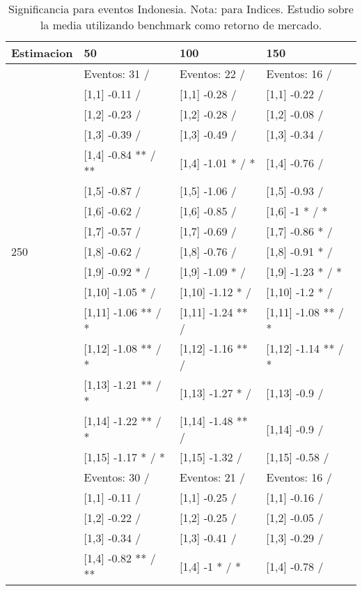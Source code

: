 \begin{table}

\caption{Significancia para eventos Indonesia. Nota: para Indices. Estudio sobre la media utilizando benchmark como retorno de mercado.}
\centering
\begin{tabular}[t]{llll}
\toprule
Estimacion & 50 & 100 & 150\\
\midrule
 & Eventos:  31 / & Eventos:  22 / & Eventos:  16 /\\
 & {}[1,1] -0.11  / & {}[1,1] -0.28  / & {}[1,1] -0.22  /\\
 & {}[1,2] -0.23  / & {}[1,2] -0.28  / & {}[1,2] -0.08  /\\
 & {}[1,3] -0.39  / & {}[1,3] -0.49  / & {}[1,3] -0.34  /\\
 & {}[1,4] -0.84 ** / ** & {}[1,4] -1.01 * / * & {}[1,4] -0.76  /\\
\addlinespace
 & {}[1,5] -0.87  / & {}[1,5] -1.06  / & {}[1,5] -0.93  /\\
 & {}[1,6] -0.62  / & {}[1,6] -0.85  / & {}[1,6] -1 * / *\\
 & {}[1,7] -0.57  / & {}[1,7] -0.69  / & {}[1,7] -0.86 * /\\
250 & {}[1,8] -0.62  / & {}[1,8] -0.76  / & {}[1,8] -0.91 * /\\
 & {}[1,9] -0.92 * / & {}[1,9] -1.09 * / & {}[1,9] -1.23 * / *\\
\addlinespace
 & {}[1,10] -1.05 * / & {}[1,10] -1.12 * / & {}[1,10] -1.2 * /\\
 & {}[1,11] -1.06 ** / * & {}[1,11] -1.24 ** / & {}[1,11] -1.08 ** / *\\
 & {}[1,12] -1.08 ** / * & {}[1,12] -1.16 ** / & {}[1,12] -1.14 ** / *\\
 & {}[1,13] -1.21 ** / * & {}[1,13] -1.27 * / & {}[1,13] -0.9  /\\
 & {}[1,14] -1.22 ** / * & {}[1,14] -1.48 ** / & {}[1,14] -0.9  /\\
\addlinespace
 & {}[1,15] -1.17 * / * & {}[1,15] -1.32  / & {}[1,15] -0.58  /\\
 & Eventos:  30 / & Eventos:  21 / & Eventos:  16 /\\
 & {}[1,1] -0.11  / & {}[1,1] -0.25  / & {}[1,1] -0.16  /\\
 & {}[1,2] -0.22  / & {}[1,2] -0.25  / & {}[1,2] -0.05  /\\
 & {}[1,3] -0.34  / & {}[1,3] -0.41  / & {}[1,3] -0.29  /\\
\addlinespace
 & {}[1,4] -0.82 ** / ** & {}[1,4] -1 * / * & {}[1,4] -0.78  /\\

\end{tabular}
\end{table}

